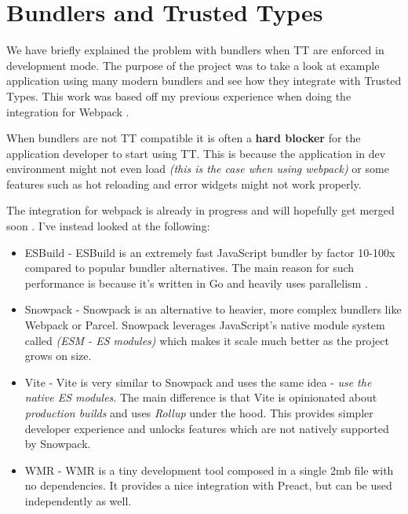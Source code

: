 \chapter{Bundlers and Trusted Types}

\label{chapter:bundlers} %

We have briefly explained the problem with bundlers when TT are enforced in development mode. The
purpose of the project was to take a look at example application using many modern bundlers and see
how they integrate with Trusted Types. This work was based off my previous experience when doing the
integration for Webpack \cite{webpack_tt_integration}.

When bundlers are not TT compatible it is often a \textbf{hard blocker} for the application
developer to start using TT. This is because the application in dev environment might not even load
\emph{(this is the case when using webpack)} or some features such as hot reloading and error
widgets might not work properly.

The integration for webpack is already in progress and will hopefully get merged soon
\cite{webpack_tt_integration_soon_to_merge}. I've instead looked at the following:

\begin{itemize}
  \item  ESBuild \cite{esbuild_web} - ESBuild is an extremely fast JavaScript bundler by factor
        10-100x compared to popular bundler alternatives. The main reason for such performance is
        because it's written in Go and heavily uses parallelism \cite{esbuild_fast}.
  \item  Snowpack \cite{snowpack_web} - Snowpack is an alternative to heavier, more complex bundlers
        like Webpack or Parcel. Snowpack leverages JavaScript's native module system called
        \emph{(ESM - ES modules)} which makes it scale much better as the project grows on size.
  \item  Vite \cite{vite_web} - Vite is very similar to Snowpack and uses the same idea - \emph{use
          the native ES modules}. The main difference is that Vite is opinionated about
        \emph{production builds} and uses \emph{Rollup} under the hood. This provides simpler
        developer experience and unlocks features which are not natively supported by Snowpack.
  \item  WMR \cite{wmr_web} - WMR is a tiny development tool composed in a single 2mb file with no
        dependencies. It provides a nice integration with Preact, but can be used independently as
        well.
\end{itemize}

